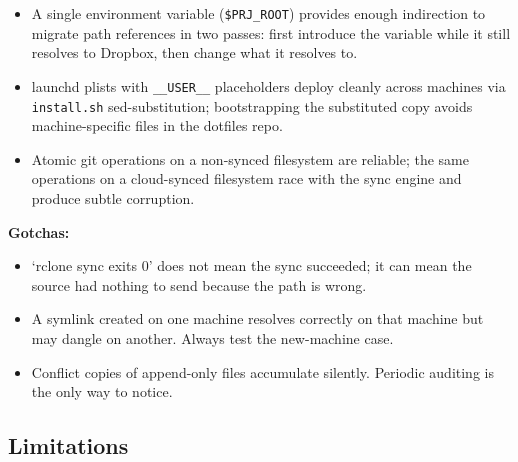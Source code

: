 \documentclass[
  11pt,
  letterpaper,
  DIV=11,
  numbers=noendperiod]{scrartcl}
\providecommand{\tightlist}{%
  \setlength{\itemsep}{0pt}\setlength{\parskip}{0pt}}\usepackage{longtable,booktabs,array}
\begin{document}
\begin{itemize}
\tightlist
\item
  A single environment variable (\texttt{\$PRJ\_ROOT}) provides enough
  indirection to migrate path references in two passes: first introduce
  the variable while it still resolves to Dropbox, then change what it
  resolves to.
\item
  launchd plists with \texttt{\_\_USER\_\_} placeholders deploy cleanly
  across machines via \texttt{install.sh} sed-substitution;
  bootstrapping the substituted copy avoids machine-specific files in
  the dotfiles repo.
\item
  Atomic git operations on a non-synced filesystem are reliable; the
  same operations on a cloud-synced filesystem race with the sync engine
  and produce subtle corruption.
\end{itemize}

\textbf{Gotchas:}

\begin{itemize}
\tightlist
\item
  `rclone sync exits 0' does not mean the sync succeeded; it can mean
  the source had nothing to send because the path is wrong.
\item
  A symlink created on one machine resolves correctly on that machine
  but may dangle on another. Always test the new-machine case.
\item
  Conflict copies of append-only files accumulate silently. Periodic
  auditing is the only way to notice.
\end{itemize}

\subsection{Limitations}\label{limitations}
\end{document}

